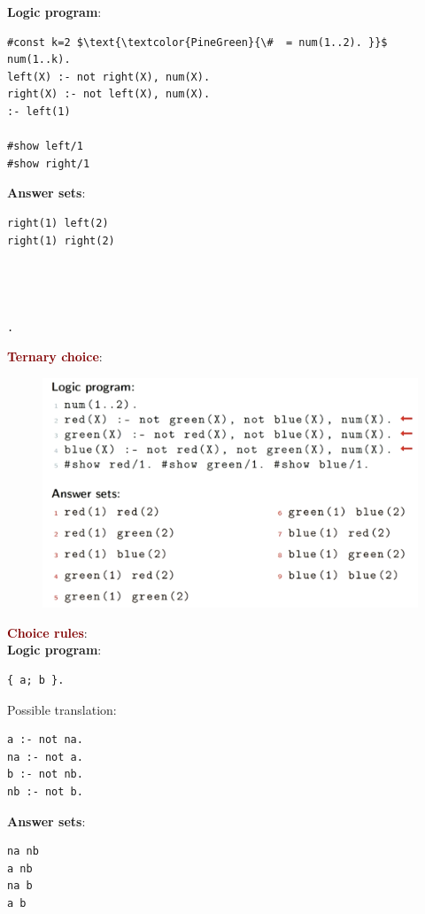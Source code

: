 \begin{minipage}{0.6\textwidth}
\textbf{Logic program}:
\begin{lstlisting}
#const k=2 $\text{\textcolor{PineGreen}{\#  = num(1..2). }}$
num(1..k). 
left(X) :- not right(X), num(X).
right(X) :- not left(X), num(X).
:- left(1) 

#show left/1 
#show right/1
\end{lstlisting}
\end{minipage}
\begin{minipage}{0.4\textwidth}
\textbf{Answer sets}:
\begin{lstlisting}
right(1) left(2) 
right(1) right(2) 




.
\end{lstlisting}
\end{minipage}

\newpage 
{\Large \textbf{\textcolor{Maroon}{ Ternary choice}}}: 

\begin{figure}[ht!]
    \includegraphics[scale=0.6]{figures/ternary.png}
\end{figure}

\vspace{0.35cm}

{\Large \textbf{\textcolor{Maroon}{Choice rules}}}: \\
\textbf{Logic program}:
\begin{lstlisting}
{ a; b }.
\end{lstlisting}

\begin{minipage}{0.5\textwidth}
Possible translation:
\begin{lstlisting}
a :- not na.
na :- not a.
b :- not nb.
nb :- not b.
\end{lstlisting}
\end{minipage}
\begin{minipage}{0.5\textwidth}
\textbf{Answer sets}:
\begin{lstlisting}
na nb
a nb
na b
a b
\end{lstlisting}
\end{minipage}

